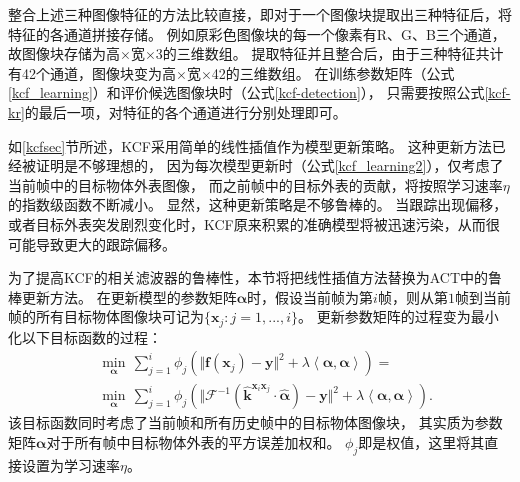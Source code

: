 整合上述三种图像特征的方法比较直接，即对于一个图像块提取出三种特征后，将特征的各通道拼接存储。
例如原彩色图像块的每一个像素有R、G、B三个通道，故图像块存储为高$\times$宽$\times$3的三维数组。
提取特征并且整合后，由于三种特征共计有42个通道，图像块变为高$\times$宽$\times$42的三维数组。
在训练参数矩阵（公式\ref{kcf_learning}）和评价候选图像块时（公式\ref{kcf-detection}），
只需要按照公式\ref{kcf-kr}的最后一项，对特征的各个通道进行分别处理即可。

如\ref{kcfsec}节所述，KCF采用简单的线性插值作为模型更新策略。
这种更新方法已经被证明是不够理想的，
因为每次模型更新时（公式\ref{kcf_learning2}），仅考虑了当前帧中的目标物体外表图像，
而之前帧中的目标外表的贡献，将按照学习速率$\eta$的指数级函数不断减小。
显然，这种更新策略是不够鲁棒的。
当跟踪出现偏移，或者目标外表突发剧烈变化时，KCF原来积累的准确模型将被迅速污染，从而很可能导致更大的跟踪偏移。

为了提高KCF的相关滤波器的鲁棒性，本节将把线性插值方法替换为ACT中的鲁棒更新方法。
在更新模型的参数矩阵$\boldsymbol{\alpha}$时，假设当前帧为第$i$帧，则从第$1$帧到当前帧的所有目标物体图像块可记为$\{\mathbf{x}_j : j=1, ..., i\}$。
更新参数矩阵的过程变为最小化以下目标函数的过程：
\begin{equation}
\begin{aligned}
	&\underset{\boldsymbol{\alpha}}{\min}\,\sum_{j=1}^{i}\phi_j(\Vert\mathbf{f}(\mathbf{x}_j)-\mathbf{y}\Vert^{2}+\lambda \left\langle\boldsymbol{\alpha}, \boldsymbol{\alpha}\right\rangle)=
	\\
	&\underset{\boldsymbol{\alpha}}{\min}\,\sum_{j=1}^{i}\phi_j(\Vert\mathcal{F}^{-1}(\hat{\mathbf{k}}^{\mathbf{x}_i\mathbf{x}_j}\cdot\hat{\boldsymbol{\alpha}})-\mathbf{y}\Vert^{2}+\lambda \left\langle\boldsymbol{\alpha}, \boldsymbol{\alpha}\right\rangle).
	\label{act-cost}
\end{aligned}
\end{equation}
该目标函数同时考虑了当前帧和所有历史帧中的目标物体图像块，
其实质为参数矩阵$\boldsymbol{\alpha}$对于所有帧中目标物体外表的平方误差加权和。
$\phi_j$即是权值，这里将其直接设置为学习速率$\eta$。

